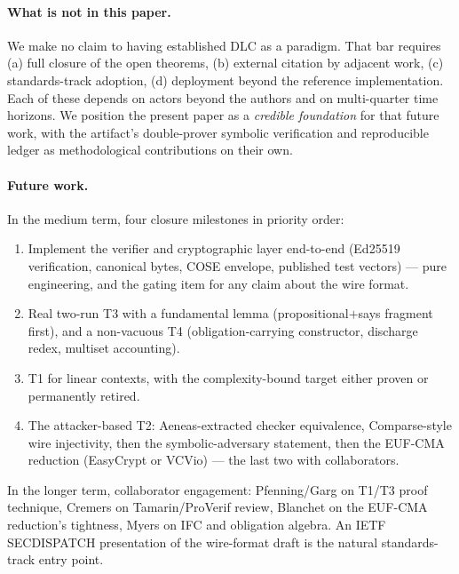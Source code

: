 \paragraph{What is not in this paper.}  We make no claim to having
established DLC as a paradigm.  That bar requires (a) full closure of
the open theorems, (b) external citation by adjacent work,
(c) standards-track adoption, (d) deployment beyond the reference
implementation.  Each of these depends on actors beyond the authors
and on multi-quarter time horizons.  We position the present paper as
a \emph{credible foundation} for that future work, with the artifact's
double-prover symbolic verification and reproducible ledger as
methodological contributions on their own.

\paragraph{Future work.}  In the medium term, four closure milestones
in priority order:

\begin{enumerate}
\item Implement the verifier and cryptographic layer end-to-end
  (Ed25519 verification, canonical bytes, COSE envelope, published
  test vectors) --- pure engineering, and the gating item for any
  claim about the wire format.
\item Real two-run T3 with a fundamental lemma
  (propositional$+$\textsf{says} fragment first), and a non-vacuous
  T4 (obligation-carrying constructor, discharge redex, multiset
  accounting).
\item T1 for linear contexts, with the complexity-bound target either
  proven or permanently retired.
\item The attacker-based T2: Aeneas-extracted checker equivalence,
  Comparse-style wire injectivity, then the symbolic-adversary
  statement, then the EUF-CMA reduction (EasyCrypt or VCVio) ---
  the last two with collaborators.
\end{enumerate}

In the longer term, collaborator engagement: Pfenning/Garg on T1/T3
proof technique, Cremers on Tamarin/ProVerif review, Blanchet on the
EUF-CMA reduction's tightness, Myers on IFC and obligation
algebra.  An IETF SECDISPATCH presentation of the wire-format draft
is the natural standards-track entry point.


